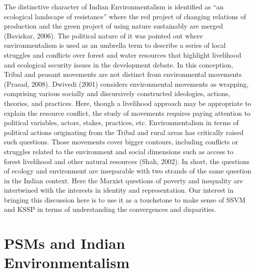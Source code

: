 \documentclass[twoside, 13pt]{article}
\begin{document}
{The distinctive character of Indian Environmentalism is identified as “an ecological landscape of resistance” where the red project of changing relations of production and the green project of using nature sustainably are merged (Baviskar, 2006). The political nature of it was pointed out where environmentalism is used as an umbrella term to describe a series of local struggles and conflicts over forest and water resources that highlight livelihood and ecological security issues in the development debate. In this conception, Tribal and peasant movements are not distinct from environmental movements (Prasad, 2008). Dwivedi (2001) considers environmental movements as wrapping, comprising various socially and discursively constructed ideologies, actions, theories, and practices. Here, though a livelihood approach may be appropriate to explain the resource conflict, the study of movements requires paying attention to political variables, actors, stakes, practices, etc. Environmentalism in terms of political actions originating from the Tribal and rural areas has critically raised such questions. Those movements cover bigger contours, including conflicts or struggles related to the environment and social dimensions such as access to forest livelihood and other natural resources (Shah, 2002). In short, the questions of ecology and environment are inseparable with two strands of the same question in the Indian context. Here the Marxist questions of poverty and inequality are intertwined with the interests in identity and representation. Our interest in bringing this discussion here is to use it as a touchstone to make sense of SSVM and KSSP in terms of understanding the convergences and disparities.}



\newpage

{\fontsize{18}{20}\selectfont\section*{PSMs and Indian Environmentalism}}


\vspace{-.3cm}
\end{document}
